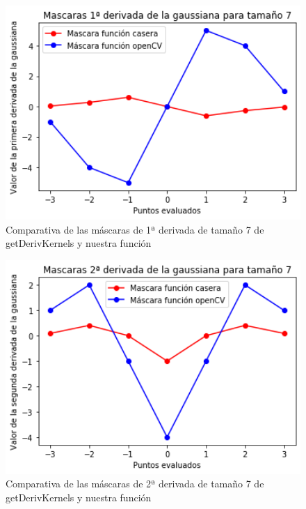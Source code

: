 \documentclass[12pt,spanish]{article}
\begin{document}
\begin{figure}[H]
	\centering
	\includegraphics[width=12cm]{./imagenes_memoria/1d_t7.png}
	\caption{Comparativa de las máscaras de 1ª derivada de tamaño 7 de getDerivKernels y nuestra función}
	\label{mask_1d_t7}
\end{figure}

\begin{figure}[H]
	\centering
	\includegraphics[width=12cm]{./imagenes_memoria/2d_t7.png}
	\caption{Comparativa de las máscaras de 2ª derivada de tamaño 7 de getDerivKernels y nuestra función}
	\label{mask_2d_t7}
\end{figure}
\end{document}

